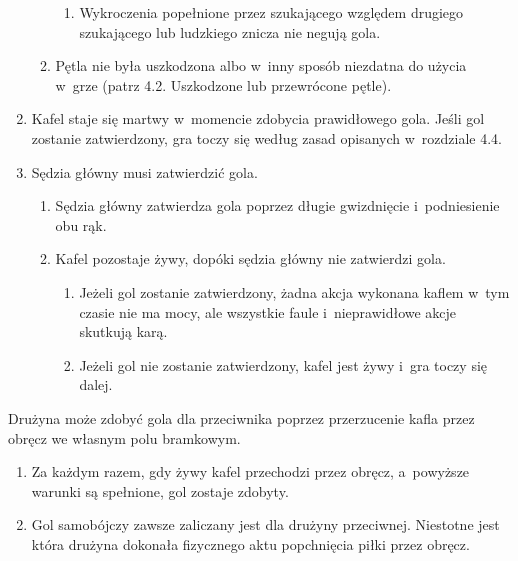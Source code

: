 \documentclass[12pt,a4paper]{article}
\renewcommand{\subsubsection}[1]{
  \oldsubsubsection{#1}%
  \leftskip1.5cm
}
\begin{document}
\begin{enumerate}
\begin{enumerate}
		            \begin{enumerate}
			            \item
			                  Wykroczenia popełnione przez szukającego względem drugiego
			                  szukającego lub ludzkiego znicza nie negują gola.
		            \end{enumerate}
		      \item
		            Pętla nie była uszkodzona albo w~inny sposób niezdatna do użycia w~grze (patrz 4.2. Uszkodzone lub przewrócone pętle).
	      \end{enumerate}
	\item
	      Kafel staje się martwy w~momencie zdobycia prawidłowego gola. Jeśli
	      gol zostanie zatwierdzony, gra toczy się według zasad opisanych w~rozdziale 4.4.
	\item
	      Sędzia główny musi zatwierdzić gola.

	      \begin{enumerate}
		      \item
		            Sędzia główny zatwierdza gola poprzez długie gwizdnięcie i~podniesienie obu rąk.
		      \item
		            Kafel pozostaje żywy, dopóki sędzia główny nie zatwierdzi gola.

		            \begin{enumerate}
			            \item
			                  Jeżeli gol zostanie zatwierdzony, żadna akcja wykonana kaflem w~tym czasie nie ma mocy, ale wszystkie faule i~nieprawidłowe akcje
			                  skutkują karą.
			            \item
			                  Jeżeli gol nie zostanie zatwierdzony, kafel jest żywy i~gra toczy
			                  się dalej.
		            \end{enumerate}
	      \end{enumerate}
\end{enumerate}

\subsubsection{Gol samobójczy}
Drużyna może zdobyć gola dla
przeciwnika poprzez przerzucenie kafla przez obręcz we własnym polu
bramkowym.

\begin{enumerate}
	\item
	      Za każdym razem, gdy żywy kafel przechodzi przez obręcz, a~powyższe
	      warunki są spełnione, gol zostaje zdobyty.
	\item
	      Gol samobójczy zawsze zaliczany jest dla drużyny przeciwnej. Niestotne
	      jest która drużyna dokonała fizycznego aktu popchnięcia piłki przez
	      obręcz.
\end{enumerate}
\end{document}
